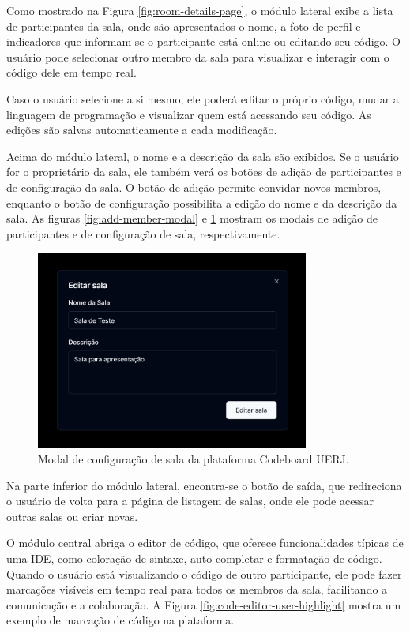 Como mostrado na Figura \ref{fig:room-details-page}, o módulo lateral exibe a lista de participantes da sala, onde são apresentados o nome, a foto de perfil e indicadores que informam se o participante está online ou editando seu código. O usuário pode selecionar outro membro da sala para visualizar e interagir com o código dele em tempo real.

Caso o usuário selecione a si mesmo, ele poderá editar o próprio código, mudar a linguagem de programação e visualizar quem está acessando seu código. As edições são salvas automaticamente a cada modificação.

Acima do módulo lateral, o nome e a descrição da sala são exibidos. Se o usuário for o proprietário da sala, ele também verá os botões de adição de participantes e de configuração da sala. O botão de adição permite convidar novos membros, enquanto o botão de configuração possibilita a edição do nome e da descrição da sala. As figuras \ref{fig:add-member-modal} e \ref{fig:edit-room-modal} mostram os modais de adição de participantes e de configuração de sala, respectivamente.

\begin{figure}[H]
    \centering
    \caption{Modal de configuração de sala da plataforma Codeboard UERJ.}
    \label{fig:edit-room-modal}
    \includegraphics[width=0.8\textwidth]{assets/codeboard/edit-room-modal.png}
\end{figure}

Na parte inferior do módulo lateral, encontra-se o botão de saída, que redireciona o usuário de volta para a página de listagem de salas, onde ele pode acessar outras salas ou criar novas.

O módulo central abriga o editor de código, que oferece funcionalidades típicas de uma IDE, como coloração de sintaxe, auto-completar e formatação de código. Quando o usuário está visualizando o código de outro participante, ele pode fazer marcações visíveis em tempo real para todos os membros da sala, facilitando a comunicação e a colaboração. A Figura \ref{fig:code-editor-user-highlight} mostra um exemplo de marcação de código na plataforma.

